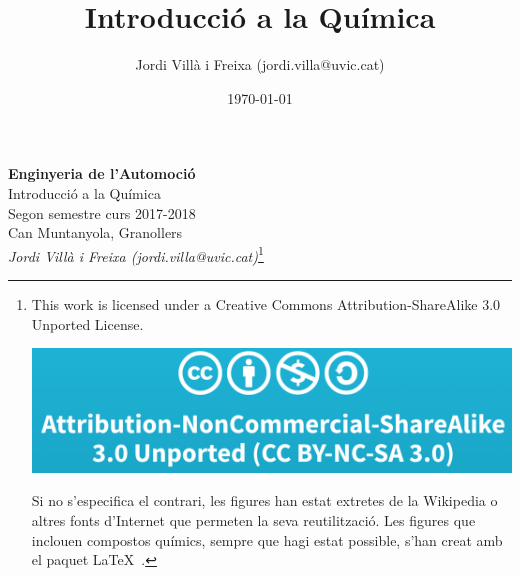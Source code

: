 \documentclass{book}
\title{Introducció a la Química}
\date{\today}
\author{Jordi Vill\`a i Freixa (jordi.villa@uvic.cat)}
\begin{document}
\thispagestyle{empty}

\begin{center}
{\LARGE \bf Enginyeria de l'Automoció}\\
{\large Introducció a la Química}\\
Segon semestre curs 2017-2018\\
Can Muntanyola, Granollers\\
\textit{Jordi Vill\`a i Freixa (jordi.villa@uvic.cat)}\footnote{This work is licensed under a Creative Commons Attribution-ShareAlike 3.0 Unported License.
  \begin{center}
    \includegraphics[scale=0.1]{figures/CC-BY-NC-SA.png}
  \end{center}
  Si no s'especifica el contrari, les figures han estat extretes de la Wikipedia o altres fonts d'Internet que permeten la seva reutilització. Les figures que inclouen compostos químics, sempre que hagi estat possible, s'han creat amb el paquet \LaTeX\ 
    .}
\end{center}


\tableofcontents





%
%
%


%
%
%


%
%


%
%


%
%


%
%
%
\end{document}
